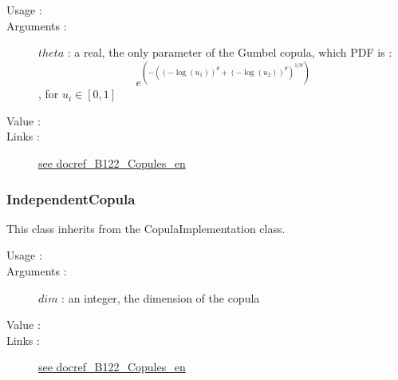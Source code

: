 \begin{description}

\item[Usage :] \rule{0pt}{1em}


\item[Arguments :]  $theta$     : a real, the only parameter of the Gumbel copula, which PDF is :
  $$
  \displaystyle e^{\left(-\left((-\log(u_1))^{\theta}+(-\log(u_2))^{\theta}\right)^{1/\theta}\right)}
  $$, for $u_i \in [0,1]$

\item[Value :]  \rule{0pt}{1em}

\item[Links :]
  \href{./Version/docref_B122_Copules_en.pdf}{see docref\_B122\_Copules\_en}
\end{description}

\newpage \subsubsection{IndependentCopula}

This class inherits from the CopulaImplementation class.

\begin{description}

\item[Usage :] \rule{0pt}{1em}

\item[Arguments :]  $dim$       : an integer, the dimension of the copula

\item[Value :] \rule{0pt}{1em}

\item[Links :]
  \href{./Version/docref_B122_Copules_en.pdf}{see docref\_B122\_Copules\_en}
\end{description}


